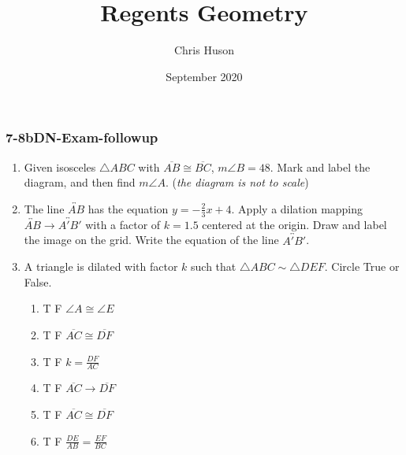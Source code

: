 \documentclass[12pt, twoside]{article}
\title{Regents Geometry}
\author{Chris Huson}
\date{September 2020}
\begin{document}
\subsubsection*{7-8bDN-Exam-followup}
\begin{enumerate}
\item Given isosceles $\triangle ABC$ with $\overline{AB} \cong \overline{BC}$, $m\angle B = 48$. Mark and label the diagram, and then find $m\angle A$. \hfill (\emph{the diagram is not to scale})
    \begin{flushright}
    \end{flushright}
    
\item The line $\overleftrightarrow{AB}$ has the equation $y=-\frac{2}{3}x+4$. Apply a dilation mapping $\overleftrightarrow{AB} \rightarrow \overleftrightarrow{A'B'}$ with a factor of $k=1.5$ centered at the origin. Draw and label the image on the grid. Write the equation of the line $\overleftrightarrow{A'B'}$.
    \begin{flushright} %
    \end{flushright}

\item A triangle is dilated with factor $k$ such that $\triangle ABC \sim \triangle DEF$. Circle True or False.
    \begin{enumerate}[itemsep=0.5cm]
      \item T \quad F \quad $\angle A \cong \angle E$
      \item T \quad F \quad $\overline{AC} \cong \overline{DF}$
      \item T \quad F \quad $\displaystyle k=\frac{DF}{AC}$
      \item T \quad F \quad $\overline{AC} \rightarrow \overline{DF}$
      \item T \quad F \quad $\overline{AC} \cong \overline{DF}$
      \item T \quad F \quad $\displaystyle \frac{DE}{AB} = \frac{EF}{BC}$
    \end{enumerate}


\end{enumerate}
\end{document}
